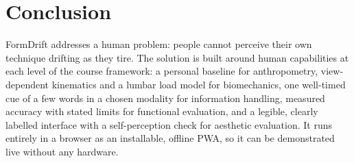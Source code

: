 \documentclass[12pt]{article}
\begin{document}
\section{Conclusion}

FormDrift addresses a human problem: people cannot perceive their own technique drifting as they tire. The solution is built around human capabilities at each level of the course framework: a personal baseline for anthropometry, view-dependent kinematics and a lumbar load model for biomechanics, one well-timed cue of a few words in a chosen modality for information handling, measured accuracy with stated limits for functional evaluation, and a legible, clearly labelled interface with a self-perception check for aesthetic evaluation. It runs entirely in a browser as an installable, offline PWA, so it can be demonstrated live without any hardware.

\end{document}

